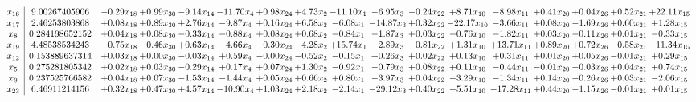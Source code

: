 \documentclass[9pt]{article}
\begin{document}
 \[\begin{array}{c| c c@{\hskip 2pt} c@{\hskip 2pt} c@{\hskip 2pt} c@{\hskip 2pt} c@{\hskip 2pt} c@{\hskip 2pt} c@{\hskip 2pt} c@{\hskip 2pt} c@{\hskip 2pt} c@{\hskip 2pt} c@{\hskip 2pt} c@{\hskip 2pt} c@{\hskip 2pt} c@{\hskip 2pt} c@{\hskip 2pt} }
 x_{16}   &  9.00267405906 & -0.29 x_{18} & +  0.99 x_{30} & -9.14 x_{14} & -11.70 x_{4} & +  0.98 x_{24} & +  4.73 x_{2} & -11.10 x_{1} & -6.95 x_{3} & -0.24 x_{22} & +  8.71 x_{10} & -8.98 x_{11} & +  0.41 x_{20} & +  0.04 x_{26} & +  0.52 x_{21} & + 22.11 x_{15}\\
 x_{17}   &  2.46253803868 & +  0.08 x_{18} & +  0.89 x_{30} & +  2.76 x_{14} & -9.87 x_{4} & +  0.16 x_{24} & +  6.58 x_{2} & -6.08 x_{1} & -14.87 x_{3} & +  0.32 x_{22} & -22.17 x_{10} & -3.66 x_{11} & +  0.08 x_{20} & -1.69 x_{26} & +  0.60 x_{21} & +  1.28 x_{15}\\
 x_{8}   &  0.284198652152 & +  0.04 x_{18} & +  0.08 x_{30} & -0.33 x_{14} & -0.88 x_{4} & +  0.08 x_{24} & +  0.68 x_{2} & -0.84 x_{1} & -1.87 x_{3} & +  0.03 x_{22} & -0.76 x_{10} & -1.82 x_{11} & +  0.03 x_{20} & -0.11 x_{26} & +  0.01 x_{21} & -0.33 x_{15}\\
 x_{19}   &  4.48538534243 & -0.75 x_{18} & -0.46 x_{30} & +  0.63 x_{14} & -4.66 x_{4} & -0.30 x_{24} & -4.28 x_{2} & + 15.74 x_{1} & +  2.89 x_{3} & -0.81 x_{22} & +  1.31 x_{10} & + 13.71 x_{11} & +  0.89 x_{20} & +  0.72 x_{26} & -0.58 x_{21} & -11.34 x_{15}\\
 x_{12}   &  0.153889637314 & +  0.03 x_{18} & +  0.00 x_{30} & -0.03 x_{14} & +  0.59 x_{4} & -0.00 x_{24} & -0.52 x_{2} & -0.15 x_{1} & +  0.26 x_{3} & +  0.02 x_{22} & +  0.13 x_{10} & +  0.31 x_{11} & +  0.01 x_{20} & +  0.05 x_{26} & -0.01 x_{21} & +  0.29 x_{15}\\
 x_{5}   &  0.275281805342 & +  0.02 x_{18} & +  0.03 x_{30} & -0.29 x_{14} & +  0.17 x_{4} & +  0.07 x_{24} & +  1.30 x_{2} & -0.92 x_{1} & -0.79 x_{3} & +  0.08 x_{22} & +  0.11 x_{10} & -0.44 x_{11} & -0.01 x_{20} & -0.03 x_{26} & +  0.04 x_{21} & +  0.74 x_{15}\\
 x_{9}   &  0.237525766582 & +  0.04 x_{18} & +  0.07 x_{30} & -1.53 x_{14} & -1.44 x_{4} & +  0.05 x_{24} & +  0.66 x_{2} & +  0.80 x_{1} & -3.97 x_{3} & +  0.04 x_{22} & -3.29 x_{10} & -1.34 x_{11} & +  0.14 x_{20} & -0.26 x_{26} & +  0.03 x_{21} & -2.06 x_{15}\\
 x_{23}   &  6.46911214156 & +  0.32 x_{18} & +  0.47 x_{30} & +  4.57 x_{14} & -10.90 x_{4} & +  1.03 x_{24} & +  2.18 x_{2} & -2.14 x_{1} & -29.12 x_{3} & +  0.40 x_{22} & -5.51 x_{10} & -17.28 x_{11} & +  0.44 x_{20} & -1.15 x_{26} & -0.01 x_{21} & +  0.01 x_{15}\\

\end{array}\]
\end{document}
